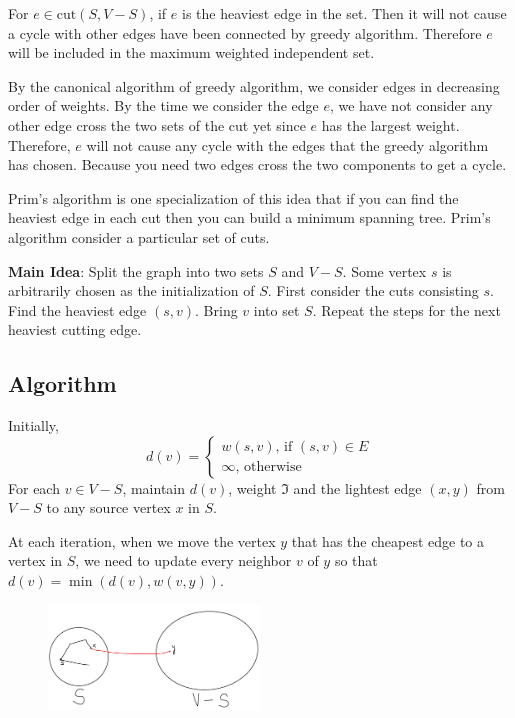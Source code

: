 \begin{claim}
	For $e \in \text{cut}(S, V-S)$, if $e$ is the heaviest edge in the set. Then it will not cause a cycle with other edges have been connected by greedy algorithm. Therefore $e$ will be included in the maximum weighted independent set.
\end{claim}
\begin{claimproof}
	By the canonical algorithm of greedy algorithm, we consider edges in decreasing order of weights. By the time we consider the edge $e$, we have not consider any other edge cross the two sets of the cut yet since $e$ has the largest weight. Therefore, $e$ will not cause any cycle with the edges that the greedy algorithm has chosen. Because you need two edges cross the two components to get a cycle.
\end{claimproof}

Prim's algorithm is one specialization of this idea that if you can find the heaviest edge in each cut then you can build a minimum spanning tree. Prim's algorithm consider a particular set of cuts.

\textbf{Main Idea}: Split the graph into two sets $S$ and $V-S$. Some vertex $s$ is arbitrarily chosen as the initialization of $S$. First consider the cuts consisting $s$. Find the heaviest edge $(s, v)$. Bring $v$ into set $S$. Repeat the steps for the next heaviest cutting edge.

\subsection{Algorithm}
Initially, 
\[
d(v) = 
\begin{cases}
w(s, v) \text{, if $(s,v) \in E$}\\
\infty \text{, otherwise}
\end{cases}
\]
For each $ v \in V-S $, maintain $ d(v) $, weight $ \mathfrak{I} $ and the lightest edge $(x, y)$ from $V-S$ to any source vertex $x$ in $S$.

At each iteration, when we move the vertex $y$ that has the cheapest
edge to a vertex in $S$, we need to update every neighbor $v$ of $y$ so that $ d(v) = \min(d(v), w(v, y)) $.
\begin{figure}[H]
	\centering
	\includegraphics[width=0.5\textwidth]{prim.png}
\end{figure}

